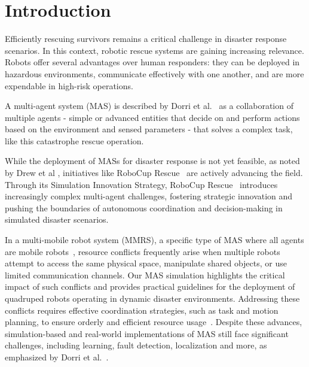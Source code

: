 \documentclass[3p,times,procedia]{elsarticle}
\begin{document}


\section{Introduction}
\label{sec:introduction}

Efficiently rescuing survivors remains a critical challenge in disaster response scenarios. In this context, robotic rescue systems are gaining increasing relevance. Robots offer several advantages over human responders: they can be deployed in hazardous environments, communicate effectively with one another, and are more expendable in high-risk operations.

A multi-agent system (MAS) is described by Dorri et al.\ \cite{Dorri2018Multi} as a collaboration of multiple agents - simple or advanced entities that decide on and perform actions based on the environment and sensed parameters - that solves a complex task, like this catastrophe rescue operation.

While the deployment of MASs for disaster response is not yet feasible, as noted by Drew et al \cite{Drew2021Multi}, initiatives like RoboCup Rescue\ \cite{robocuprescue2025} are actively advancing the field. Through its Simulation Innovation Strategy, RoboCup Rescue\ \cite{Visser2015RoboCup} introduces increasingly complex multi-agent challenges, fostering strategic innovation and pushing the boundaries of autonomous coordination and decision-making in simulated disaster scenarios. 

In a multi-mobile robot system (MMRS), a specific type of MAS where all agents are mobile robots\ \cite{yan2013survey}, resource conflicts frequently arise when multiple robots attempt to access the same physical space, manipulate shared objects, or use limited communication channels. 
Our MAS simulation highlights the critical impact of such conflicts and provides practical guidelines for the deployment of quadruped robots operating in dynamic disaster environments.
Addressing these conflicts requires effective coordination strategies, such as task and motion planning, to ensure orderly and efficient resource usage\ \cite{yan2013survey,Parker2016multiple}.
Despite these advances, simulation-based and real-world implementations of MAS still face significant challenges, including learning, fault detection, localization and more, as emphasized by Dorri et al.\ \cite{Dorri2018Multi}.
\end{document}
